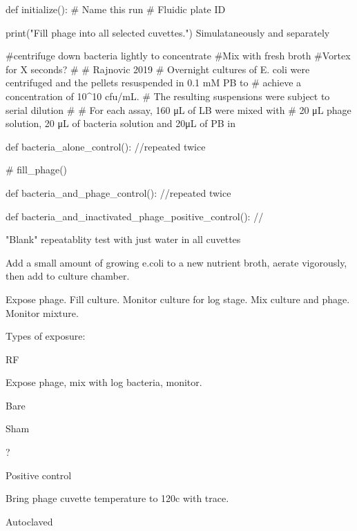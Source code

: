 \documentclass[paper.tex]{subfiles}
\begin{document}
def initialize():
    # Name this run
    # Fluidic plate ID


    print("Fill phage into all selected cuvettes.")
    Simulataneously and separately

#centrifuge down bacteria lightly to concentrate
#Mix with fresh broth
#Vortex for X seconds?
#
# Rajnovic 2019
# Overnight cultures of E. coli were centrifuged and the pellets resuspended in 0.1 mM PB to
# achieve a concentration of 10^10 cfu/mL.
# The resulting suspensions were subject to serial dilution
#
# For each assay, 160 μL of LB were mixed with
# 20 μL phage solution, 20 μL of bacteria solution and 20μL of PB in


def bacteria_alone_control():
    //repeated twice

    # fill_phage()


def bacteria_and_phage_control():
    //repeated twice


def bacteria_and_inactivated_phage_positive_control():
    //

"Blank" repeatablity test with just water in all cuvettes


Add a small amount of growing e.coli to a new nutrient broth,
aerate vigorously, then add to culture chamber.

Expose phage.
Fill culture.
Monitor culture for log stage.
Mix culture and phage.
Monitor mixture.

Types of exposure:

RF

Expose phage, mix with log bacteria, monitor.

Bare

Sham

?

Positive control

Bring phage cuvette temperature to 120c with trace.



Autoclaved
\end{document}
